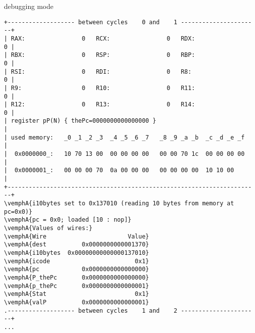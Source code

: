 
\begin{frame}[fragile,label=debugNopJmp]{debugging mode}
\begin{Verbatim}[fontsize=\fontsize{8}{9}\selectfont,commandchars=\\\{\}]
+------------------- between cycles    0 and    1 ----------------------+
| RAX:                0   RCX:                0   RDX:                0 |
| RBX:                0   RSP:                0   RBP:                0 |
| RSI:                0   RDI:                0   R8:                 0 |
| R9:                 0   R10:                0   R11:                0 |
| R12:                0   R13:                0   R14:                0 |
| register pP(N) { thePc=0000000000000000 }                             |
| used memory:   _0 _1 _2 _3  _4 _5 _6 _7   _8 _9 _a _b  _c _d _e _f    |
|  0x0000000_:   10 70 13 00  00 00 00 00   00 00 70 1c  00 00 00 00    |
|  0x0000001_:   00 00 00 70  0a 00 00 00   00 00 00 00  10 10 00       |
+-----------------------------------------------------------------------+
\vemphA{i10bytes set to 0x137010 (reading 10 bytes from memory at pc=0x0)}
\vemphA{pc = 0x0; loaded [10 : nop]}
\vemphA{Values of wires:}
\vemphA{Wire                       Value}
\vemphA{dest          0x0000000000001370}
\vemphA{i10bytes  0x00000000000000137010}
\vemphA{icode                        0x1}
\vemphA{pc            0x0000000000000000}
\vemphA{P_thePc       0x0000000000000000}
\vemphA{p_thePc       0x0000000000000001}
\vemphA{Stat                         0x1}
\vemphA{valP          0x0000000000000001}
.------------------- between cycles    1 and    2 ----------------------+
...
\end{Verbatim}
\end{frame}

